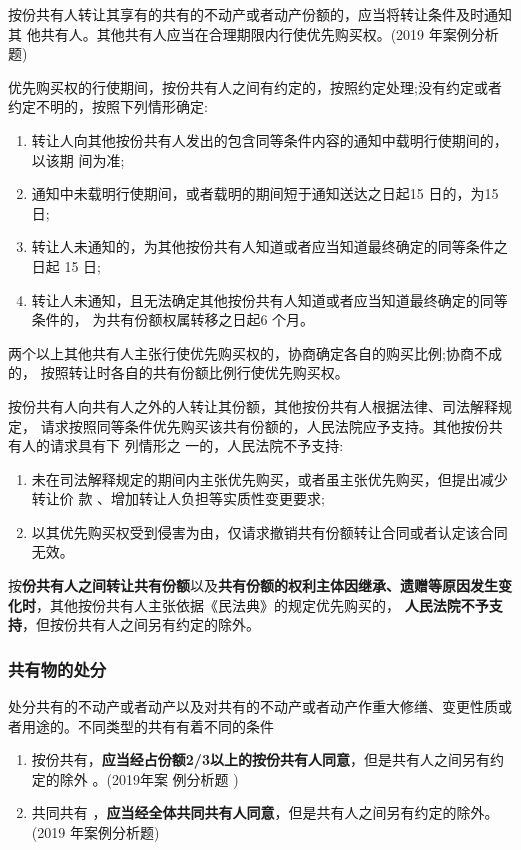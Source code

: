 \documentclass[UTF8,12pt]{ctexart}
\numberwithin{equation}{section} %
\numberwithin{figure}{section}
\numberwithin{table}{section}
\begin{document}
	按份共有人转让其享有的共有的不动产或者动产份额的，应当将转让条件及时通知其 他共有人。其他共有人应当在合理期限内行使优先购买权。(2019 年案例分析题)
	
	优先购买权的行使期间，按份共有人之间有约定的，按照约定处理;没有约定或者约定不明的，按照下列情形确定:
	\begin{enumerate}
		\item 转让人向其他按份共有人发出的包含同等条件内容的通知中载明行使期间的，以该期 间为准;
		
		\item 通知中未载明行使期间，或者载明的期间短于通知送达之日起15 日的，为15 日;
		
		\item 转让人未通知的，为其他按份共有人知道或者应当知道最终确定的同等条件之日起 15 日;
		
		\item 转让人未通知，且无法确定其他按份共有人知道或者应当知道最终确定的同等条件的， 为共有份额权属转移之日起6 个月。
	\end{enumerate}
	
	两个以上其他共有人主张行使优先购买权的，协商确定各自的购买比例;协商不成的， 按照转让时各自的共有份额比例行使优先购买权。
	
	按份共有人向共有人之外的人转让其份额，其他按份共有人根据法律、司法解释规定， 请求按照同等条件优先购买该共有份额的，人民法院应予支持。其他按份共有人的请求具有下 列情形之 一的，人民法院不予支持: 
	\begin{enumerate}
		\item 未在司法解释规定的期间内主张优先购买，或者虽主张优先购买，但提出减少转让价 款 、增加转让人负担等实质性变更要求;
		
		\item 以其优先购买权受到侵害为由，仅请求撤销共有份额转让合同或者认定该合同无效。 
	\end{enumerate}
	
	按\textbf{份共有人之间转让共有份额}以及\textbf{共有份额的权利主体因继承、遗赠等原因发生变化时}，其他按份共有人主张依据《民法典》的规定优先购买的， \textbf{人民法院不予支持}，但按份共有人之间另有约定的除外。
	
	
	\subsubsection{共有物的处分}
	处分共有的不动产或者动产以及对共有的不动产或者动产作重大修缮、变更性质或者用途的。不同类型的共有有着不同的条件
	\begin{enumerate}
		\item 按份共有，\textbf{应当经占份额2/3以上的按份共有人同意}，但是共有人之间另有约定的除外 。(2019年案 例分析题 )
		
		\item 共同共有 ，\textbf{应当经全体共同共有人同意}，但是共有人之间另有约定的除外。(2019 年案例分析题)
	\end{enumerate}
	
\end{document}
